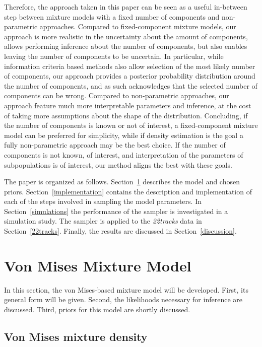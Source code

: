 Therefore, the approach taken in this paper can be seen as a useful in-between step between mixture models with a fixed number of components and non-parametric approaches. Compared to fixed-component mixture models, our approach is more realistic in the uncertainty about the amount of components, allows performing inference about the number of components, but also enables leaving the number of components to be uncertain. In particular, while information criteria based methods also allow selection of the most likely number of components, our approach provides a posterior probability distribution around the number of components, and as such acknowledges that the selected number of components can be wrong. Compared to non-parametric approaches, our approach feature much more interpretable parameters and inference, at the cost of taking more assumptions about the shape of the distribution. Concluding, if the number of components is known or not of interest, a fixed-component mixture model can be preferred for simplicity, while if density estimation is the goal a fully non-parametric approach may be the best choice. If the number of components is not known, of interest, and interpretation of the parameters of subpopulations is of interest, our method aligns the best with these goals.

The paper is organized as follows. Section~\ref{design} describes the model and chosen priors. Section~\ref{implementation} contains the description and implementation of each of the steps involved in sampling the model parameters. In Section~\ref{simulations} the performance of the sampler is investigated in a simulation study. The sampler is applied to the \textit{22tracks} data in Section~\ref{22tracks}. Finally, the results are discussed in Section~\ref{discussion}.


\section{Von Mises Mixture Model}
\label{design}

In this section, the von Mises-based mixture model will be developed. First, its general form will be given. Second, the likelihoods necessary for inference are discussed. Third, priors for this model are shortly discussed. 

\subsection{Von Mises mixture density}

